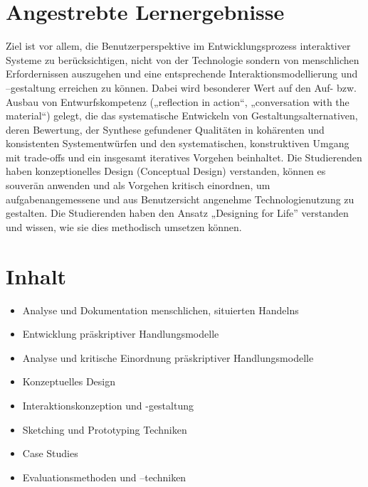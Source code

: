 \section*{Angestrebte
Lernergebnisse\label{/mi-2017/modulbeschreibungen-master/MA_HCI_InteractionDesign}}\label{angestrebte-lernergebnissepathlabelmi-2017modulbeschreibungen-mastermaux5fhciux5finteractiondesign}

Ziel ist vor allem, die Benutzerperspektive im Entwicklungsprozess
interaktiver Systeme zu berücksichtigen, nicht von der Technologie
sondern von menschlichen Erfordernissen auszugehen und eine
entsprechende Interaktionsmodellierung und --gestaltung erreichen zu
können. Dabei wird besonderer Wert auf den Auf- bzw. Ausbau von
Entwurfskompetenz („reflection in action``, „conversation with the
material``) gelegt, die das systematische Entwickeln von
Gestaltungsalternativen, deren Bewertung, der Synthese gefundener
Qualitäten in kohärenten und konsistenten Systementwürfen und den
systematischen, konstruktiven Umgang mit trade-offs und ein insgesamt
iteratives Vorgehen beinhaltet. Die Studierenden haben konzeptionelles
Design (Conceptual Design) verstanden, können es souverän anwenden und
als Vorgehen kritisch einordnen, um aufgabenangemessene und aus
Benutzersicht angenehme Technologienutzung zu gestalten. Die
Studierenden haben den Ansatz „Designing for Life'' verstanden und
wissen, wie sie dies methodisch umsetzen können.

\section*{Inhalt\label{/mi-2017/modulbeschreibungen-master/MA_HCI_InteractionDesign}}\label{inhaltpathlabelmi-2017modulbeschreibungen-mastermaux5fhciux5finteractiondesign}

\begin{itemize}
\tightlist
\item
  Analyse und Dokumentation menschlichen, situierten Handelns
\item
  Entwicklung präskriptiver Handlungsmodelle
\item
  Analyse und kritische Einordnung präskriptiver Handlungsmodelle
\item
  Konzeptuelles Design
\item
  Interaktionskonzeption und -gestaltung
\item
  Sketching und Prototyping Techniken
\item
  Case Studies
\item
  Evaluationsmethoden und --techniken
\end{itemize}

